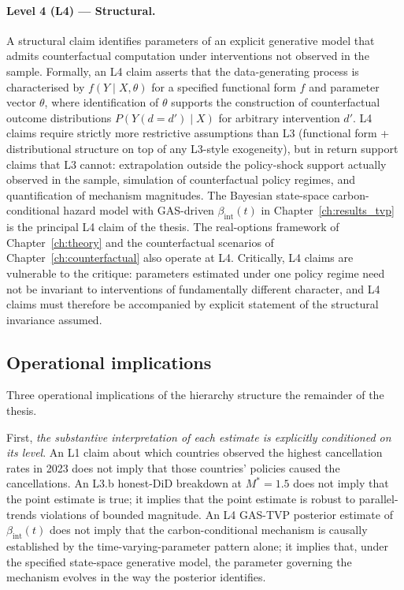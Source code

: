 \paragraph{Level 4 (L4) --- Structural.} A structural claim identifies parameters of an explicit generative model that admits counterfactual computation under interventions not observed in the sample. Formally, an L4 claim asserts that the data-generating process is characterised by $f(Y \mid X, \theta)$ for a specified functional form $f$ and parameter vector $\theta$, where identification of $\theta$ supports the construction of counterfactual outcome distributions $P(Y(d=d') \mid X)$ for arbitrary intervention $d'$. L4 claims require strictly more restrictive assumptions than L3 (functional form + distributional structure on top of any L3-style exogeneity), but in return support claims that L3 cannot: extrapolation outside the policy-shock support actually observed in the sample, simulation of counterfactual policy regimes, and quantification of mechanism magnitudes. The Bayesian state-space carbon-conditional hazard model with GAS-driven $\beta_{\mathrm{int}}(t)$ in Chapter~\ref{ch:results_tvp} is the principal L4 claim of the thesis. The real-options framework of Chapter~\ref{ch:theory} and the counterfactual scenarios of Chapter~\ref{ch:counterfactual} also operate at L4. Critically, L4 claims are vulnerable to the \cite{lucas1976econometric} critique: parameters estimated under one policy regime need not be invariant to interventions of fundamentally different character, and L4 claims must therefore be accompanied by explicit statement of the structural invariance assumed.

\subsection{Operational implications}
\label{sec:methods_operational}

Three operational implications of the hierarchy structure the remainder of the thesis.

First, \emph{the substantive interpretation of each estimate is explicitly conditioned on its level}. An L1 claim about which countries observed the highest cancellation rates in 2023 does not imply that those countries' policies caused the cancellations. An L3.b honest-DiD breakdown at $M^* = 1.5$ does not imply that the point estimate is true; it implies that the point estimate is robust to parallel-trends violations of bounded magnitude. An L4 GAS-TVP posterior estimate of $\beta_{\mathrm{int}}(t)$ does not imply that the carbon-conditional mechanism is causally established by the time-varying-parameter pattern alone; it implies that, under the specified state-space generative model, the parameter governing the mechanism evolves in the way the posterior identifies.

